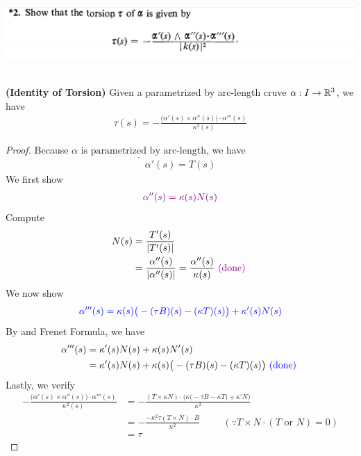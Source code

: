 \documentclass{report}
\begin{document}
\begin{question}{}{}
\includegraphics[height=3cm,width=18cm]{hw2q4}
\end{question}
\begin{theorem}
\textbf{(Identity of Torsion)} Given a parametrized by arc-length cruve $\alpha  :I \rightarrow \mathbb{R}^3$, we have 
\begin{align*}
\tau(s)=-\frac{\big(\alpha '(s)\times \alpha ''(s) \big)\cdot \alpha '''(s)}{\kappa ^2 (s)}
\end{align*}
\end{theorem}
\begin{proof}
Because $\underline{\alpha  \text{ is parametrized by arc-length}}$, we have 
\begin{align*}
  \alpha '(s)=T(s)
\end{align*}
We first show 
\begin{align}
\label{A'''}
\textcolor{violet}{\alpha ''(s)=\kappa (s)N(s)}
\end{align}
Compute 
\begin{align*}
N(s)&=\frac{T'(s)}{\left|T'(s)\right|}\\
&=\frac{\alpha ''(s)}{\left|\alpha ''(s)\right|}=\frac{\alpha ''(s)}{\kappa (s)}\textcolor{violet}{\text{ (done) }}
\end{align*}
We now show 
\begin{align*}
\textcolor{blue}{\alpha '''(s)=\kappa(s)\big(-(\tau B)(s)-(\kappa T)(s)\big)+\kappa'(s)N(s) }
\end{align*}
By  and Frenet Formula, we have 
\begin{align*}
\alpha '''(s)&=\kappa'(s)N(s)+\kappa(s)N'(s)\\
&=\kappa'(s)N(s)+\kappa(s)\big(- (\tau B)(s)-(\kappa T)(s) \big)\textcolor{blue}{\text{ (done) }}
\end{align*}
Lastly, we verify 
\begin{align*}
-\frac{\big(\alpha '(s)\times \alpha ''(s) \big)\cdot \alpha '''(s)}{\kappa^2(s)}&=-\frac{(T\times \kappa N)\cdot \Big( \kappa \big(-\tau B-\kappa T \big)+\kappa ' N\Big) }{\kappa ^2}\\
&=-\frac{-\kappa^2 \tau (T\times N)\cdot B }{\kappa^2}\hspace{1cm}(\because T\times N \cdot (T\text{ or }N)=0)\\
&=\tau 
\end{align*}
\end{proof}
\end{document}
